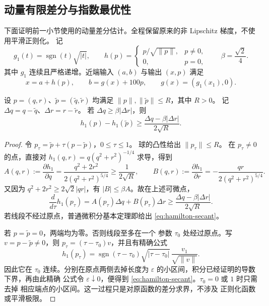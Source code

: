\subsection{动量有限差分与指数最优性}
\label{app:hamilton-finite-difference}

下面证明前一小节使用的动量差分估计。全程保留原来的非 Lipschitz 梯度，不使用平滑正则化。
记
\[
 g_1(t)=\operatorname{sgn}(t)\sqrt{|t|},\qquad
 h(p)=\begin{cases}p/\sqrt{\|p\|},&p\ne0,\\0,&p=0,\end{cases}
 \qquad \beta=\frac{\sqrt2}{4}.
\]
其中 $g_1$ 连续且严格递增。近端输入 $(a,b)$ 与输出 $(x,p)$
满足
\begin{equation}
\label{eq:hamilton-app-prox}
 x=a+h(p),\qquad b=g(x)+100p,
 \qquad g(x)=(g_1(x_1),0).
\end{equation}

\begin{lemma}[动量球上的有限差分]
\label{lem:hamilton-secant}
设 $p=(q,r)$、$\widetilde p=(\widetilde q,\widetilde r)$
均满足 $\|p\|,\|\widetilde p\|\leq R$，其中 $R>0$。
记 $\Delta q=q-\widetilde q$、$\Delta r=r-\widetilde r$。
若 $\Delta q\geq\beta|\Delta r|$，则
\begin{equation}
\label{eq:hamilton-secant}
 h_1(p)-h_1(\widetilde p)
 \geq\frac{\Delta q-\beta|\Delta r|}{2\sqrt R}.
\end{equation}
\end{lemma}

\begin{proof}
令 $p_\tau=\widetilde p+\tau(p-\widetilde p)$，$0\leq\tau\leq1$。
球的凸性给出 $\|p_\tau\|\leq R$。
在 $p_\tau\ne0$ 的点，直接对
$h_1(q,r)=q(q^2+r^2)^{-1/4}$ 求导，得到
\[
 A(q,r):=\frac{\partial h_1}{\partial q}
 =\frac{q^2+2r^2}{2(q^2+r^2)^{5/4}}
 \geq\frac1{2\sqrt R},\qquad
 B(q,r):=\frac{\partial h_1}{\partial r}
 =-\frac{qr}{2(q^2+r^2)^{5/4}}.
\]
又因为 $q^2+2r^2\geq2\sqrt2|qr|$，有
$|B|\leq\beta A$。故在上述可微点，
\[
 \frac{d}{d\tau}h_1(p_\tau)
 =A(p_\tau)\Delta q+B(p_\tau)\Delta r
 \geq\frac{\Delta q-\beta|\Delta r|}{2\sqrt R}.
\]
若线段不经过原点，普通微积分基本定理即给出
\eqref{eq:hamilton-secant}。

若 $p=\widetilde p=0$，两端均为零。否则线段至多在一个
参数 $\tau_0$ 处经过原点。写 $v=p-\widetilde p\ne0$，则
$p_\tau=(\tau-\tau_0)v$，并且有精确公式
\[
 h_1(p_\tau)
 =\operatorname{sgn}(\tau-\tau_0)
   \sqrt{|\tau-\tau_0|}\,\frac{v_1}{\sqrt{\|v\|}}.
\]
因此它在 $\tau_0$ 连续。分别在原点两侧去掉长度为
$\varepsilon$ 的小区间，积分已经证明的导数下界，再由此精确
公式令 $\varepsilon\downarrow0$，便得到
\eqref{eq:hamilton-secant}。$\tau_0=0$ 或 $1$ 时只需去掉
相应端点的小区间。这一过程只是对原函数的差分求界，不涉及
正则化函数或平滑极限。
\end{proof}

